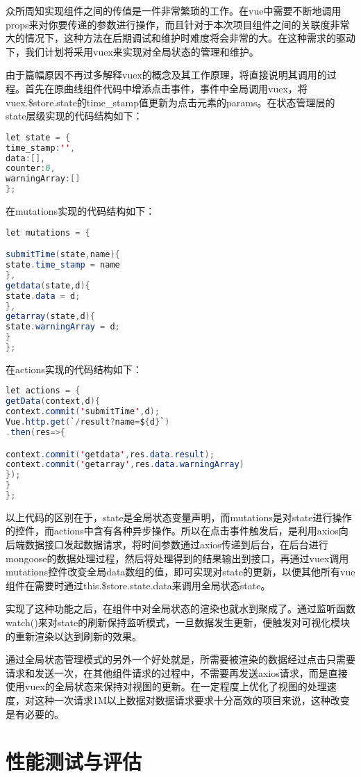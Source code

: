 众所周知实现组件之间的传值是一件非常繁琐的工作。在vue中需要不断地调用props来对你要传递的参数进行操作，而且针对于本次项目组件之间的关联度非常大的情况下，这种方法在后期调试和维护时难度将会非常的大。在这种需求的驱动下，我们计划将采用vuex来实现对全局状态的管理和维护。

由于篇幅原因不再过多解释vuex的概念及其工作原理，将直接说明其调用的过程。首先在原曲线组件代码中增添点击事件，事件中全局调用vuex，将vuex.\$store.state的time\_stamp值更新为点击元素的params。在状态管理层的state层级实现的代码结构如下：

\begin{lstlisting}[caption=state层级结构,frame=shadowbox,language={java}]
let state = {
time_stamp:'',
data:[],
counter:0,
warningArray:[]
};
\end{lstlisting}

在mutations实现的代码结构如下：

\newpage
\begin{lstlisting}[caption=mutations层级结构,frame=shadowbox,language={java}]
let mutations = {

submitTime(state,name){
state.time_stamp = name
},
getdata(state,d){
state.data = d;
},
getarray(state,d){
state.warningArray = d;
}
};
\end{lstlisting}

在actions实现的代码结构如下：

\begin{lstlisting}[caption=actions层级结构,frame=shadowbox,language={java}]
let actions = {
getData(context,d){
context.commit('submitTime',d);
Vue.http.get(`/result?name=${d}`)
.then(res=>{

context.commit('getdata',res.data.result);
context.commit('getarray',res.data.warningArray)
});
}
};
\end{lstlisting}

以上代码的区别在于，state是全局状态变量声明，而mutations是对state进行操作的控件，而actions中含有各种异步操作。所以在点击事件触发后，是利用axios向后端数据接口发起数据请求，将时间参数通过axios传递到后台，在后台进行mongoose的数据处理过程，然后将处理得到的结果输出到接口，再通过vuex调用mutations控件改变全局data数组的值，即可实现对state的更新，以便其他所有vue组件在需要时通过this.\$store.state.data来调用全局状态state。

实现了这种功能之后，在组件中对全局状态的渲染也就水到聚成了。通过监听函数watch()来对state的刷新保持监听模式，一旦数据发生更新，便触发对可视化模块的重新渲染以达到刷新的效果。

通过全局状态管理模式的另外一个好处就是，所需要被渲染的数据经过点击只需要请求和发送一次，在其他组件请求的过程中，不需要再发送axios请求，而是直接使用vuex的全局状态来保持对视图的更新。在一定程度上优化了视图的处理速度，对这种一次请求1M以上数据对数据请求要求十分高效的项目来说，这种改变是有必要的。

\section{性能测试与评估}
